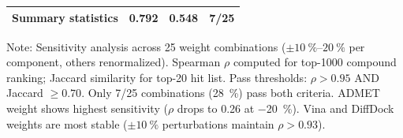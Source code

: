 \documentclass[journal=jcisd8,manuscript=suppinfo]{achemso}
\begin{document}
\begin{table}[htbp]
\begin{tabular}{lccccccccc}
\midrule
\multicolumn{7}{l}{\textbf{Summary statistics}} & \num{0.792} & \num{0.548} & \num{7}/\num{25} \\
\bottomrule
\end{tabular}
\vspace{0.5em}
\begin{footnotesize}
Note: Sensitivity analysis across \num{25} weight combinations ($\pm \qtyrange{10}{20}{\percent}$ per component, others renormalized).
Spearman $\rho$ computed for top-\num{1000} compound ranking; Jaccard similarity for top-\num{20} hit list.
Pass thresholds: $\rho > \num{0.95}$ AND Jaccard $\geq \num{0.70}$. Only \num{7}/\num{25} combinations (\qty{28}{\percent}) pass both criteria.
ADMET weight shows highest sensitivity ($\rho$ drops to \num{0.26} at \qty{-20}{\percent}). Vina and DiffDock weights
are most stable ($\pm \qty{10}{\percent}$ perturbations maintain $\rho > \num{0.93}$).
\end{footnotesize}
\end{table}
\end{document}
